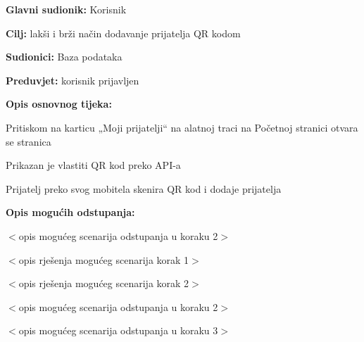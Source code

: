 	\noindent {}
\begin{packed_item}
	
	\item \textbf{Glavni sudionik: }Korisnik
	\item  \textbf{Cilj:} lakši i brži način dodavanje prijatelja QR kodom
	\item  \textbf{Sudionici:}
	Baza podataka
	\item  \textbf{Preduvjet:} korisnik prijavljen
	\item  \textbf{Opis osnovnog tijeka:}
	
	\item[] \begin{packed_enum}
		
		\item	Pritiskom na karticu „Moji prijatelji“ na alatnoj traci na Početnoj stranici otvara se stranica
		\item	Prikazan je vlastiti QR kod preko API-a
		\item	Prijatelj preko svog mobitela skenira QR kod i dodaje prijatelja
		
	\end{packed_enum}
	
	\item  \textbf{Opis mogućih odstupanja:}
	
	\item[] \begin{packed_item}
		
		\item[2.a] $<$opis mogućeg scenarija odstupanja u koraku 2$>$
		\item[] \begin{packed_enum}
			
			\item $<$opis rješenja mogućeg scenarija korak 1$>$
			\item $<$opis rješenja mogućeg scenarija korak 2$>$
			
		\end{packed_enum}
		\item[2.b] $<$opis mogućeg scenarija odstupanja u koraku 2$>$
		\item[3.a] $<$opis mogućeg scenarija odstupanja  u koraku 3$>$
		
	\end{packed_item}
\end{packed_item}

